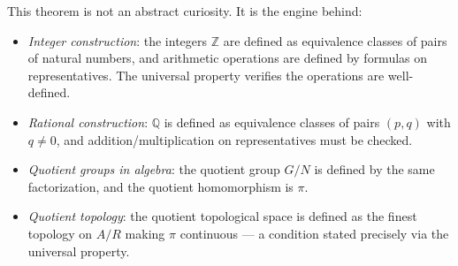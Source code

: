\begin{remark*}
This theorem is not an abstract curiosity. It is the engine behind:
\begin{itemize}
\item \emph{Integer construction}: the integers $\mathbb{Z}$ are defined as
equivalence classes of pairs of natural numbers, and arithmetic operations
are defined by formulas on representatives. The universal property verifies
the operations are well-defined.
\item \emph{Rational construction}: $\mathbb{Q}$ is defined as equivalence
classes of pairs $(p,q)$ with $q \neq 0$, and addition/multiplication on
representatives must be checked.
\item \emph{Quotient groups in algebra}: the quotient group $G/N$ is defined
by the same factorization, and the quotient homomorphism is $\pi$.
\item \emph{Quotient topology}: the quotient topological space is defined as
the finest topology on $A/R$ making $\pi$ continuous — a condition stated
precisely via the universal property.
\end{itemize}
\end{remark*}
